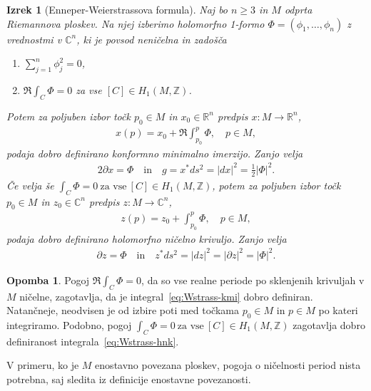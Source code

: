 \documentclass[12pt,a4paper,twoside]{article}
\theoremstyle{definition} %
\newtheorem{opomba}[definicija]{Opomba}
\theoremstyle{plain} %
\newtheorem{izrek}[definicija]{Izrek}
\numberwithin{equation}{section}  %
\newcommand{\R}{\mathbb R}
\newcommand{\Z}{\mathbb Z}
\newcommand{\C}{\mathbb C}
\begin{document}
\begin{izrek}[Enneper-Weierstrassova formula] \label{izr:Enneper-Weierstrass}
Naj bo $n \geq 3$ in $M$ odprta Riemannova ploskev. Na njej izberimo holomorfno 1-formo $\Phi = (\phi_{1}, \dots , \phi_{n})$ z vrednostmi v $\C^{n}$, ki je povsod neničelna in zadošča 
\begin{enumerate}
\item $ \sum_{j=1}^{n} \phi_{j}^{2} = 0$,
\item $ \Re \int_{C} \Phi = 0 $ za vse $[C] \in H_{1} (M, \Z)$.
\end{enumerate}
Potem za poljuben izbor točk $p_0 \in M$ in $x_0 \in \R^{n}$ predpis $x \colon M \to \R^{n}$,
\begin{align} \label{eq:Wstrass-kmi}
x(p) = x_0 + \Re \int_{p_0}^{p} \Phi, \quad p \in M,
\end{align}
podaja dobro definirano konformno minimalno imerzijo. Zanjo velja
\begin{align}
2 \partial{x} = \Phi \quad \text{in} \quad g = x^{*} ds^2 = |dx|^2 = \frac{1}{2} |\Phi|^2.
\end{align}
%
Če velja še
$ \int_{C} \Phi = 0 \ \text{za vse} \ [C] \in H_{1} (M, \Z) $,
potem za poljuben izbor točk $p_0 \in M$ in $z_0 \in \C^{n}$ predpis $z \colon M \to \C^{n}$,
\begin{align} \label{eq:Wstrass-hnk}
z(p) = z_0 + \int_{p_0}^{p} \Phi, \quad p \in M,
\end{align}
podaja dobro definirano holomorfno ničelno krivuljo. Zanjo velja
\begin{align}
\partial{z} = \Phi \quad \text{in} \quad z^{*} ds^2 = |dz|^2 = |\partial{z}|^2 = |\Phi|^2.
\end{align}
\end{izrek}

\begin{opomba}
Pogoj $ \Re \int_{C} \Phi = 0 $, da so vse realne periode po sklenjenih krivuljah v $M$ ničelne, zagotavlja, da je integral~\eqref{eq:Wstrass-kmi} dobro definiran.
Natančneje, neodvisen je od izbire poti med točkama $p_0 \in M$ in $p \in M$ po kateri integriramo.
Podobno, pogoj $ \int_{C} \Phi = 0 \ \text{za vse} \ [C] \in H_{1} (M, \Z) $ zagotavlja dobro definiranost integrala~\eqref{eq:Wstrass-hnk}. 

V primeru, ko je $M$ enostavno povezana ploskev, pogoja o ničelnosti period nista potrebna, saj sledita iz definicije enostavne povezanosti. 
\end{opomba}
\end{document}
